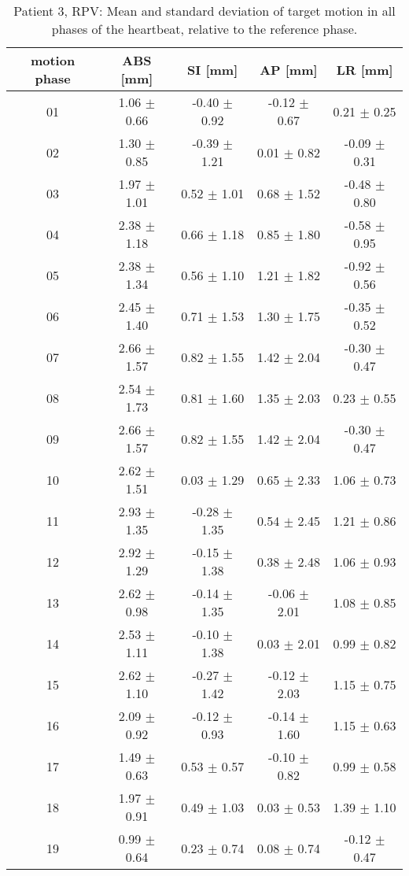 \begin{table}[htbp]
  \centering
    \tiny
  \caption{Patient 3, RPV: Mean and standard deviation of target motion in all phases of the heartbeat, relative to the reference phase.}
  \begin{tabular}{|c|c|c|c|c|}
    \hline\hline
    motion phase\rule{0pt}{2.6ex}\rule[-1.2ex]{0pt}{0pt} & ABS [mm] & SI [mm] & AP [mm] & LR [mm]\\
    \hline
01& 1.06 $\pm$ 0.66& -0.40 $\pm$ 0.92& -0.12 $\pm$ 0.67& 0.21 $\pm$ 0.25 \\
02& 1.30 $\pm$ 0.85& -0.39 $\pm$ 1.21& 0.01 $\pm$ 0.82& -0.09 $\pm$ 0.31 \\
03& 1.97 $\pm$ 1.01& 0.52 $\pm$ 1.01& 0.68 $\pm$ 1.52& -0.48 $\pm$ 0.80 \\
04& 2.38 $\pm$ 1.18& 0.66 $\pm$ 1.18& 0.85 $\pm$ 1.80& -0.58 $\pm$ 0.95 \\
05& 2.38 $\pm$ 1.34& 0.56 $\pm$ 1.10& 1.21 $\pm$ 1.82& -0.92 $\pm$ 0.56 \\
06& 2.45 $\pm$ 1.40& 0.71 $\pm$ 1.53& 1.30 $\pm$ 1.75& -0.35 $\pm$ 0.52 \\
07& 2.66 $\pm$ 1.57& 0.82 $\pm$ 1.55& 1.42 $\pm$ 2.04& -0.30 $\pm$ 0.47 \\
08& 2.54 $\pm$ 1.73& 0.81 $\pm$ 1.60& 1.35 $\pm$ 2.03& 0.23 $\pm$ 0.55 \\
09& 2.66 $\pm$ 1.57& 0.82 $\pm$ 1.55& 1.42 $\pm$ 2.04& -0.30 $\pm$ 0.47 \\
10& 2.62 $\pm$ 1.51& 0.03 $\pm$ 1.29& 0.65 $\pm$ 2.33& 1.06 $\pm$ 0.73 \\
11& 2.93 $\pm$ 1.35& -0.28 $\pm$ 1.35& 0.54 $\pm$ 2.45& 1.21 $\pm$ 0.86 \\
12& 2.92 $\pm$ 1.29& -0.15 $\pm$ 1.38& 0.38 $\pm$ 2.48& 1.06 $\pm$ 0.93 \\
13& 2.62 $\pm$ 0.98& -0.14 $\pm$ 1.35& -0.06 $\pm$ 2.01& 1.08 $\pm$ 0.85 \\
14& 2.53 $\pm$ 1.11& -0.10 $\pm$ 1.38& 0.03 $\pm$ 2.01& 0.99 $\pm$ 0.82 \\
15& 2.62 $\pm$ 1.10& -0.27 $\pm$ 1.42& -0.12 $\pm$ 2.03& 1.15 $\pm$ 0.75 \\
16& 2.09 $\pm$ 0.92& -0.12 $\pm$ 0.93& -0.14 $\pm$ 1.60& 1.15 $\pm$ 0.63 \\
17& 1.49 $\pm$ 0.63& 0.53 $\pm$ 0.57& -0.10 $\pm$ 0.82& 0.99 $\pm$ 0.58 \\
18& 1.97 $\pm$ 0.91& 0.49 $\pm$ 1.03& 0.03 $\pm$ 0.53& 1.39 $\pm$ 1.10 \\
19& 0.99 $\pm$ 0.64& 0.23 $\pm$ 0.74& 0.08 $\pm$ 0.74& -0.12 $\pm$ 0.47 \\
    \hline\hline
  \end{tabular}
\end{table}


